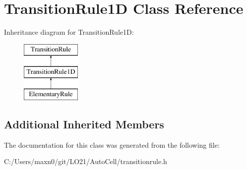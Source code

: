 \hypertarget{class_transition_rule1_d}{}\section{Transition\+Rule1D Class Reference}
\label{class_transition_rule1_d}
Inheritance diagram for Transition\+Rule1D\+:\begin{figure}[H]
\begin{center}
\leavevmode
\includegraphics[height=3.000000cm]{class_transition_rule1_d}
\end{center}
\end{figure}
\subsection*{Additional Inherited Members}


The documentation for this class was generated from the following file\+:\begin{DoxyCompactItemize}
\item 
C\+:/\+Users/maxn0/git/\+L\+O21/\+Auto\+Cell/transitionrule.\+h\end{DoxyCompactItemize}
